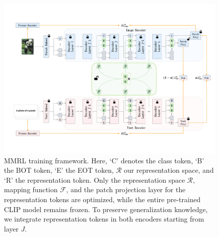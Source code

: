 

\begin{figure}
\centering
\setlength{\abovecaptionskip}{0.2cm}   %
  \includegraphics[width=0.9\linewidth]{fig/frame1.pdf}
  \caption{MMRL training framework. Here, `C' denotes the class token, `B' the BOT token, `E' the EOT token, $\mathcal{R}$ our representation space, and `R' the representation token. Only the representation space $\mathcal{R}$, mapping function $\mathcal{F}$, and the patch projection layer for the representation tokens are optimized, while the entire pre-trained CLIP model remains frozen. To preserve generalization knowledge, we integrate representation tokens in both encoders starting from layer $J$.}
  \label{framework1}
\vspace{-0.5cm}
\end{figure}

